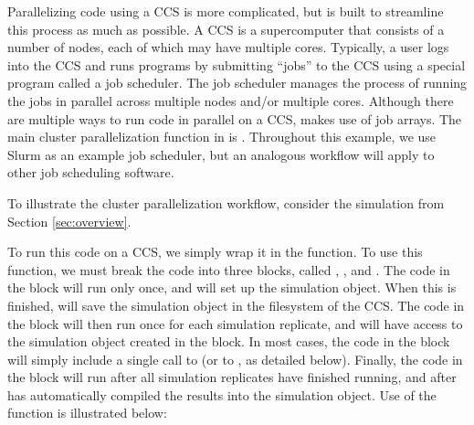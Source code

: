 Parallelizing code using a CCS is more complicated, but  is built to streamline this process as much as possible. A CCS is a supercomputer that consists of a number of nodes, each of which may have multiple cores. Typically, a user logs into the CCS and runs programs by submitting ``jobs'' to the CCS using a special program called a job scheduler. The job scheduler manages the process of running the jobs in parallel across multiple nodes and/or multiple cores. Although there are multiple ways to run code in parallel on a CCS,  makes use of job arrays. The main cluster parallelization function in  is . Throughout this example, we use Slurm as an example job scheduler, but an analogous workflow will apply to other job scheduling software.

To illustrate the cluster parallelization workflow, consider the simulation from Section \ref{sec:overview}.


To run this code on a CCS, we simply wrap it in the  function. To use this function, we must break the code into three blocks, called , , and . The code in the  block will run only once, and will set up the simulation object. When this is finished,  will save the simulation object in the filesystem of the CCS. The code in the  block will then run once for each simulation replicate, and will have access to the simulation object created in the  block. In most cases, the code in the  block will simply include a single call to  (or to , as detailed below). Finally, the code in the  block will run after all simulation replicates have finished running, and after  has automatically compiled the results into the simulation object. Use of the  function is illustrated below:

